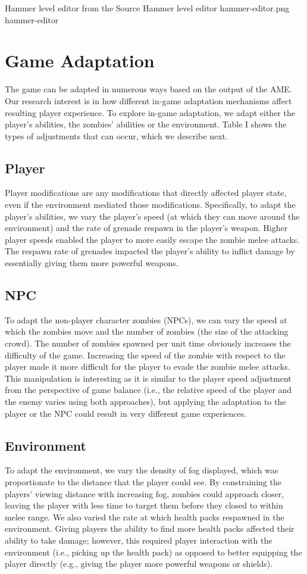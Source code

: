 \largeimg
{Hammer level editor from the Source}
{Hammer level editor}
{hammer-editor.png}
{hammer-editor}

\section{Game Adaptation}
The game can be adapted in numerous ways based on the output of the AME. Our research interest is in how different in-game adaptation mechanisms affect resulting player experience. To explore in-game adaptation, we adapt either the player's abilities, the zombies' abilities or the environment. Table I shows the types of adjustments that can occur, which we describe next.

\subsection{Player}
Player modifications are any modifications that directly affected player state, even if the environment mediated those modifications. Specifically, to adapt the player's abilities, we vary the player's speed (at which they can move around the environment) and the rate of grenade respawn in the player's weapon. Higher player speeds enabled the player to more easily escape the zombie melee attacks. The respawn rate of grenades impacted the player's ability to inflict damage by essentially giving them more powerful weapons.

\subsection{NPC}
To adapt the non-player character zombies (NPCs), we can vary the speed at which the zombies move and the number of zombies (the size of the attacking crowd). The number of zombies spawned per unit time obviously increases the difficulty of the game. Increasing the speed of the zombie with respect to the player made it more difficult for the player to evade the zombie melee attacks. This manipulation is interesting as it is similar to the player speed adjustment from the perspective of game balance (i.e., the relative speed of the player and the enemy varies using both approaches), but applying the adaptation to the player or the NPC could result in very different game experiences.

\subsection{Environment}
To adapt the environment, we vary the density of fog displayed, which was proportionate to the distance that the player could see. By constraining the players' viewing distance with increasing fog, zombies could approach closer, leaving the player with less time to target them before they closed to within melee range. We also varied the rate at which health packs respawned in the environment. Giving players the ability to find more health packs affected their ability to take damage; however, this required player interaction with the environment (i.e., picking up the health pack) as opposed to better equipping the player directly (e.g., giving the player more powerful weapons or shields).

